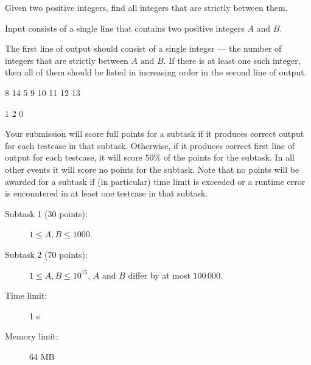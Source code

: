 \documentclass{boi2014}
\begin{document}
    Given two positive integers, find all integers that are strictly
    between them.

    \Input
    Input consists of a single line that contains two positive
    integers $A$ and $B$.

    \Output
    The first line of output should consist of a single integer ---
    the number of integers that are strictly between $A$ and $B$.
    If there is at least one such integer, then all of them should
    be listed in increasing order in the second line of output.
    
    \Examples

    \simpleexample
    {
        8 14
    }
    {
        5
        9 10 11 12 13
    }

    \simpleexample
    {
        1 2
    }
    {
        0
    }

    \Scoring

        Your submission will score full points for a subtask if it
        produces correct output for each testcase in 
        that subtask. Otherwise, if it produces correct first
        line of output for each testcase, it will score $50\%$ of the
        points for the subtask. In all other events it will score no
        points for the subtask.
        Note that no points will be awarded for a subtask if
        (in particular) time
        limit is exceeded or a runtime error is encountered in at
        least one testcase in that subtask.

    \begin{description}

        \item[Subtask 1 (30 points):] $1 \le A, B \le 1000$. 
        \item[Subtask 2 (70 points):] $1 \le A, B \le 10^{15}$,
            $A$ and $B$ differ by at most $100\,000$.
    \end{description}

    \Constraints

    \begin{description}
        \item[Time limit:] 1 s
        \item[Memory limit:] 64 MB
    \end{description}
\end{document}
